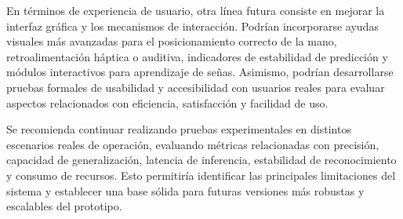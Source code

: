 	En términos de experiencia de usuario, otra línea futura consiste en mejorar la interfaz gráfica y los mecanismos de interacción. Podrían incorporarse ayudas visuales más avanzadas para el posicionamiento correcto de la mano, retroalimentación háptica o auditiva, indicadores de estabilidad de predicción y módulos interactivos para aprendizaje de señas. Asimismo, podrían desarrollarse pruebas formales de usabilidad y accesibilidad con usuarios reales para evaluar aspectos relacionados con eficiencia, satisfacción y facilidad de uso.
	
	Se recomienda continuar realizando pruebas experimentales en distintos escenarios reales de operación, evaluando métricas relacionadas con precisión, capacidad de generalización, latencia de inferencia, estabilidad de reconocimiento y consumo de recursos. Esto permitiría identificar las principales limitaciones del sistema y establecer una base sólida para futuras versiones más robustas y escalables del prototipo.
	\newpage
	
